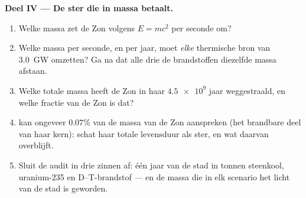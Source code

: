 \begin{problem}
\medskip
\noindent\textbf{Deel IV --- De ster die in massa betaalt.}
\begin{enumerate}[resume]
  \item Welke massa zet de Zon volgens $E = mc^2$ per seconde om?
  \item Welke massa per seconde, en per jaar, moet \emph{elke} thermische bron
        van \qty{3.0}{GW} omzetten? Ga na dat alle drie de brandstoffen
        diezelfde massa afstaan.
  \item Welke totale massa heeft de Zon in haar $\num{4.5e9}$ jaar
        weggestraald, en welke fractie van de Zon is dat?
  \item {} kan ongeveer $0.07\%$ van de massa van de Zon aanspreken
        (het brandbare deel van haar kern): schat haar totale levensduur als
        ster, en wat daarvan overblijft.
  \item Sluit de audit in drie zinnen af: één jaar van de stad in tonnen
        steenkool,  uranium-235 en  D--T-brandstof --- en de
         massa die in elk scenario het licht van de stad is geworden.
\end{enumerate}
\end{problem}
